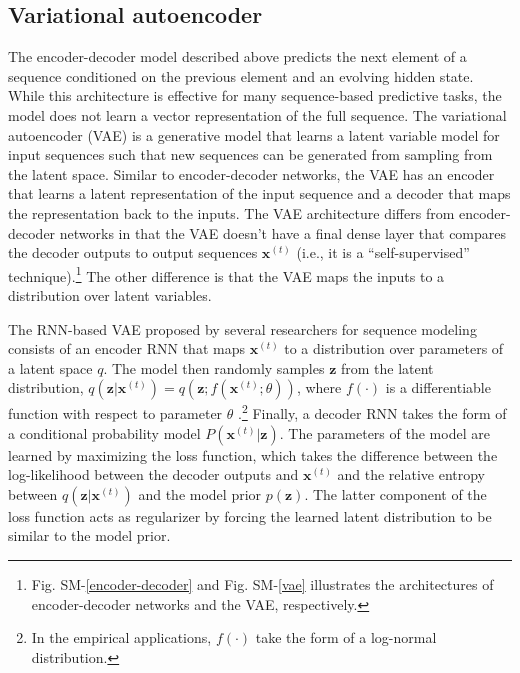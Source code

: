 \documentclass[hidelinks,12pt]{article}
\begin{document}
\subsection{Variational autoencoder}

The encoder-decoder model described above predicts the next element of a sequence conditioned on the previous element and an evolving hidden state. While this architecture is effective for many sequence-based predictive tasks, the model does not learn a vector representation of the full sequence. The variational autoencoder (VAE) \citep{kingma2013auto} is a generative model that learns a latent variable model for input sequences such that new sequences can be generated from sampling from the latent space. Similar to encoder-decoder networks, the VAE has an encoder that learns a latent representation of the input sequence and a decoder that maps the representation back to the inputs. The VAE architecture differs from encoder-decoder networks in that the VAE doesn't have a final dense layer that compares the decoder outputs to output sequences $\boldsymbol{x}^{(t)}$ (i.e., it is a ``self-supervised'' technique).\footnote{Fig. SM-\ref{encoder-decoder} and Fig. SM-\ref{vae} illustrates the architectures of encoder-decoder networks and the VAE, respectively.} The other difference is that the VAE maps the inputs to a distribution over latent variables. 

The RNN-based VAE proposed by several researchers \citep{fabius2014variational, chung2015recurrent,bowman2015generating} for sequence modeling consists of an encoder RNN that maps $\boldsymbol{x}^{(t)}$ to a distribution over parameters of a latent space $q$. The model then randomly samples $\boldsymbol{z}$ from the latent distribution, $q(\boldsymbol{z} | \boldsymbol{x}^{(t)}) = q (\boldsymbol{z}; f(\boldsymbol{x}^{(t)}; \theta))$, where $f(\cdot)$ is a differentiable function with respect to parameter $\theta$ \citep[pp. 699][]{goodfellow2016deep}.\footnote{In the empirical applications, $f(\cdot)$ take the form of a log-normal distribution.} Finally, a decoder RNN takes the form of a conditional probability model $P (\boldsymbol{x}^{(t)} | \boldsymbol{z})$. The parameters of the model are learned by maximizing the loss function, which takes the difference between the log-likelihood between the decoder outputs and $\boldsymbol{x}^{(t)}$ and the relative entropy between  $q(\boldsymbol{z} | \boldsymbol{x}^{(t)})$ and the model prior $p (\boldsymbol{z})$. The latter component of the loss function acts as regularizer by forcing the learned latent distribution to be similar to the model prior. 
\end{document}

